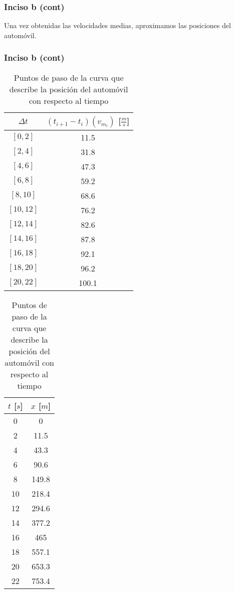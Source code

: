 \documentclass[11pt]{beamer}
\begin{document}
	\begin{frame}
		\frametitle{Inciso b (cont)}
		
		Una vez obtenidas las velocidades medias, aproximamos las posiciones del automóvil.
	\end{frame}

	\begin{frame}
		\frametitle{Inciso b (cont)}
		
		\begin{table}[H]
			\centering
			\begin{tabular}{|c|c|}
				\hline
				$\Delta t$ & $(t_{i+1} - t_{i})(v_{m_{i}})$ [$\frac{m}{s}$]\\
				\hline
				$[0,2]$&11.5\\
				\hline
				$[2,4]$&31.8\\
				\hline
				$[4,6]$&47.3\\
				\hline
				$[6,8]$&59.2\\
				\hline
				$[8,10]$&68.6\\
				\hline
				$[10,12]$&76.2\\
				\hline
				$[12,14]$&82.6\\
				\hline
				$[14,16]$&87.8\\
				\hline
				$[16,18]$&92.1\\
				\hline
				$[18,20]$&96.2\\
				\hline
				$[20,22]$&100.1\\
				\hline
			\end{tabular}
			\qquad
			\begin{tabular}{|c|c|}
				\hline
				$t$ [$s$] & $x$ [$m$]\\
				\hline
				0&0\\
				\hline
				2&11.5\\
				\hline
				4&43.3\\
				\hline
				6&90.6\\
				\hline
				8&149.8\\
				\hline
				10&218.4\\
				\hline
				12&294.6\\
				\hline
				14&377.2\\
				\hline
				16&465\\
				\hline
				18&557.1\\
				\hline
				20&653.3\\
				\hline
				22&753.4\\
				\hline
			\end{tabular}
			\caption{Puntos de paso de la curva que describe la posición del automóvil con respecto al tiempo}
			\label{tab:Posiciones2}
		\end{table}
	\end{frame}
\end{document}
